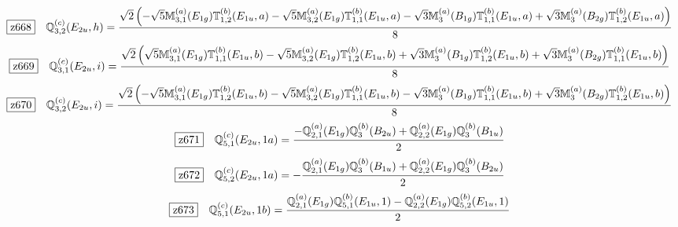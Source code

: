 \documentclass[fleqn,10pt,landscape]{jsarticle}
\begin{document}
\begin{dmath*}
\hspace*{3mm}\fbox{z668}\quad \mathbb{Q}_{3,2}^{(c)}(E_{2u},h)=\frac{\sqrt{2} \left(- \sqrt{5} \mathbb{M}_{3,1}^{(a)}(E_{1g}) \mathbb{T}_{1,2}^{(b)}(E_{1u},a) - \sqrt{5} \mathbb{M}_{3,2}^{(a)}(E_{1g}) \mathbb{T}_{1,1}^{(b)}(E_{1u},a) - \sqrt{3} \mathbb{M}_{3}^{(a)}(B_{1g}) \mathbb{T}_{1,1}^{(b)}(E_{1u},a) + \sqrt{3} \mathbb{M}_{3}^{(a)}(B_{2g}) \mathbb{T}_{1,2}^{(b)}(E_{1u},a)\right)}{8}
\end{dmath*}
\begin{dmath*}
\hspace*{3mm}\fbox{z669}\quad \mathbb{Q}_{3,1}^{(c)}(E_{2u},i)=\frac{\sqrt{2} \left(\sqrt{5} \mathbb{M}_{3,1}^{(a)}(E_{1g}) \mathbb{T}_{1,1}^{(b)}(E_{1u},b) - \sqrt{5} \mathbb{M}_{3,2}^{(a)}(E_{1g}) \mathbb{T}_{1,2}^{(b)}(E_{1u},b) + \sqrt{3} \mathbb{M}_{3}^{(a)}(B_{1g}) \mathbb{T}_{1,2}^{(b)}(E_{1u},b) + \sqrt{3} \mathbb{M}_{3}^{(a)}(B_{2g}) \mathbb{T}_{1,1}^{(b)}(E_{1u},b)\right)}{8}
\end{dmath*}
\begin{dmath*}
\hspace*{3mm}\fbox{z670}\quad \mathbb{Q}_{3,2}^{(c)}(E_{2u},i)=\frac{\sqrt{2} \left(- \sqrt{5} \mathbb{M}_{3,1}^{(a)}(E_{1g}) \mathbb{T}_{1,2}^{(b)}(E_{1u},b) - \sqrt{5} \mathbb{M}_{3,2}^{(a)}(E_{1g}) \mathbb{T}_{1,1}^{(b)}(E_{1u},b) - \sqrt{3} \mathbb{M}_{3}^{(a)}(B_{1g}) \mathbb{T}_{1,1}^{(b)}(E_{1u},b) + \sqrt{3} \mathbb{M}_{3}^{(a)}(B_{2g}) \mathbb{T}_{1,2}^{(b)}(E_{1u},b)\right)}{8}
\end{dmath*}
\begin{dmath*}
\hspace*{3mm}\fbox{z671}\quad \mathbb{Q}_{5,1}^{(c)}(E_{2u},1a)=\frac{- \mathbb{Q}_{2,1}^{(a)}(E_{1g}) \mathbb{Q}_{3}^{(b)}(B_{2u}) + \mathbb{Q}_{2,2}^{(a)}(E_{1g}) \mathbb{Q}_{3}^{(b)}(B_{1u})}{2}
\end{dmath*}
\begin{dmath*}
\hspace*{3mm}\fbox{z672}\quad \mathbb{Q}_{5,2}^{(c)}(E_{2u},1a)=- \frac{\mathbb{Q}_{2,1}^{(a)}(E_{1g}) \mathbb{Q}_{3}^{(b)}(B_{1u}) + \mathbb{Q}_{2,2}^{(a)}(E_{1g}) \mathbb{Q}_{3}^{(b)}(B_{2u})}{2}
\end{dmath*}
\begin{dmath*}
\hspace*{3mm}\fbox{z673}\quad \mathbb{Q}_{5,1}^{(c)}(E_{2u},1b)=\frac{\mathbb{Q}_{2,1}^{(a)}(E_{1g}) \mathbb{Q}_{5,1}^{(b)}(E_{1u},1) - \mathbb{Q}_{2,2}^{(a)}(E_{1g}) \mathbb{Q}_{5,2}^{(b)}(E_{1u},1)}{2}
\end{dmath*}
\end{document}
